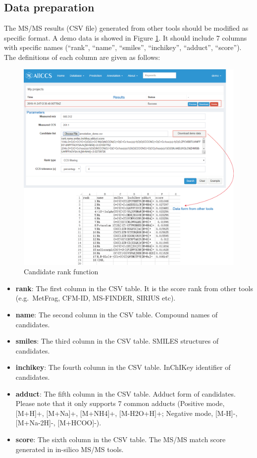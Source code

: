 \documentclass[12pt,]{book}
\providecommand{\tightlist}{%
  \setlength{\itemsep}{0pt}\setlength{\parskip}{0pt}}
\theoremstyle{definition}
\theoremstyle{definition}
\theoremstyle{definition}
\theoremstyle{remark}
\begin{document}
\subsection{Data preparation}\label{chapter4d2d1}

The MS/MS results (CSV file) generated from other tools should be
modified as specific format. A demo data is showed in Figure
\ref{fig:figure4d3}. It should include 7 columns with specific names
(``rank'', ``name'', ``smiles'', ``inchikey'', ``adduct'', ``score'').
The definitions of each column are given as follows:

\begin{figure}

{\centering \includegraphics{images/chapter4/figure4.3candidate_rank} 

}

\caption{Candidate rank function}\label{fig:figure4d3}
\end{figure}

\begin{itemize}
\tightlist
\item
  \textbf{rank}: The first column in the CSV table. It is the score rank
  from other tools (e.g.~MetFrag, CFM-ID, MS-FINDER, SIRIUS etc).
\item
  \textbf{name}: The second column in the CSV table. Compound names of
  candidates.
\item
  \textbf{smiles}: The third column in the CSV table. SMILES structures
  of candidates.
\item
  \textbf{inchikey}: The fourth column in the CSV table. InChIKey
  identifier of candidates.
\item
  \textbf{adduct}: The fifth column in the CSV table. Adduct form of
  candidates. Please note that it only supports 7 common adducts
  (Positive mode, {[}M+H{]}+, {[}M+Na{]}+, {[}M+NH4{]}+, {[}M-H2O+H{]}+;
  Negative mode, {[}M-H{]}-, {[}M+Na-2H{]}-, {[}M+HCOO{]}-).
\item
  \textbf{score}: The sixth column in the CSV table. The MS/MS match
  score generated in in-silico MS/MS tools.
\end{itemize}
\end{document}

